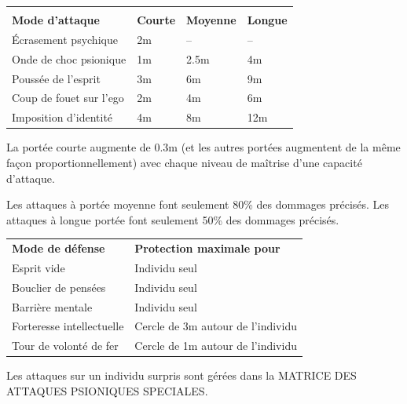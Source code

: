 \documentclass[11pt]{article}
\begin{document}
{\begin{tabular}{p{5cm} >{\centering\arraybackslash}p{2.5cm}>{\centering\arraybackslash}p{2.5cm}>{\centering\arraybackslash}p{2.5cm}}
&\multicolumn{3}{c}{\textbf{Portée}} \\
\textbf{Mode d'attaque} & \textbf{Courte} & \textbf{Moyenne} & \textbf{Longue} \\
Écrasement psychique & 2m & -- & -- \\
Onde de choc psionique & 1m & 2.5m & 4m \\
Poussée de l'esprit & 3m & 6m & 9m \\
Coup de fouet sur l'ego & 2m & 4m & 6m \\
Imposition d'identité & 4m & 8m & 12m \\
\end{tabular}

\medskip

La portée courte augmente de 0.3m (et les autres portées augmentent de la même façon proportionnellement) avec chaque niveau de maîtrise d'une capacité d'attaque.

\medskip

Les attaques à portée moyenne font seulement 80\% des dommages précisés. Les attaques à longue portée font seulement 50\% des dommages précisés.

\bigskip

\begin{tabular}{p{7.5cm}p{6cm}}
\textbf{Mode de défense} & \textbf{Protection maximale pour} \\
Esprit vide & Individu seul \\
Bouclier de pensées & Individu seul \\
Barrière mentale & Individu seul \\
Forteresse intellectuelle & Cercle de 3m autour de l'individu \\
Tour de volonté de fer & Cercle de 1m autour de l'individu \\
\end{tabular}

\bigskip

Les attaques sur un individu surpris sont gérées dans la MATRICE DES ATTAQUES PSIONIQUES SPECIALES.

\medskip

}
\end{document}
